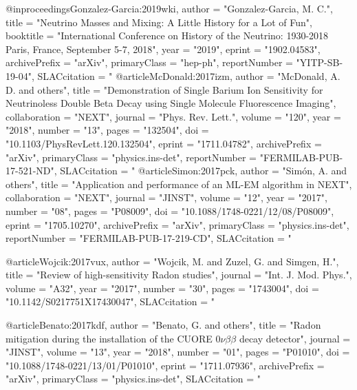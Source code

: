 {{{@inproceedings{Gonzalez-Garcia:2019wki,
      author         = "Gonzalez-Garcia, M. C.",
      title          = "{Neutrino Masses and Mixing: A Little History for a Lot
                        of Fun}",
      booktitle      = "{International Conference on History of the Neutrino:
                        1930-2018 Paris, France, September 5-7, 2018}",
      year           = "2019",
      eprint         = "1902.04583",
      archivePrefix  = "arXiv",
      primaryClass   = "hep-ph",
      reportNumber   = "YITP-SB-19-04",
      SLACcitation   = "%
} 
@article{McDonald:2017izm,
      author         = "McDonald, A. D. and others",
      title          = "{Demonstration of Single Barium Ion Sensitivity for
                        Neutrinoless Double Beta Decay using Single Molecule
                        Fluorescence Imaging}",
      collaboration  = "NEXT",
      journal        = "Phys. Rev. Lett.",
      volume         = "120",
      year           = "2018",
      number         = "13",
      pages          = "132504",
      doi            = "10.1103/PhysRevLett.120.132504",
      eprint         = "1711.04782",
      archivePrefix  = "arXiv",
      primaryClass   = "physics.ins-det",
      reportNumber   = "FERMILAB-PUB-17-521-ND",
      SLACcitation   = "%
}
@article{Simon:2017pck,
      author         = "Sim\'on, A. and others",
      title          = "{Application and performance of an ML-EM algorithm in
                        NEXT}",
      collaboration  = "NEXT",
      journal        = "JINST",
      volume         = "12",
      year           = "2017",
      number         = "08",
      pages          = "P08009",
      doi            = "10.1088/1748-0221/12/08/P08009",
      eprint         = "1705.10270",
      archivePrefix  = "arXiv",
      primaryClass   = "physics.ins-det",
      reportNumber   = "FERMILAB-PUB-17-219-CD",
      SLACcitation   = "%
}

@article{Wojcik:2017vux,
      author         = "Wojcik, M. and Zuzel, G. and Simgen, H.",
      title          = "{Review of high-sensitivity Radon studies}",
      journal        = "Int. J. Mod. Phys.",
      volume         = "A32",
      year           = "2017",
      number         = "30",
      pages          = "1743004",
      doi            = "10.1142/S0217751X17430047",
      SLACcitation   = "%
}

@article{Benato:2017kdf,
      author         = "Benato, G. and others",
      title          = "{Radon mitigation during the installation of the CUORE
                        0$\nu\beta\beta$ decay detector}",
      journal        = "JINST",
      volume         = "13",
      year           = "2018",
      number         = "01",
      pages          = "P01010",
      doi            = "10.1088/1748-0221/13/01/P01010",
      eprint         = "1711.07936",
      archivePrefix  = "arXiv",
      primaryClass   = "physics.ins-det",
      SLACcitation   = "%
}

}}}
